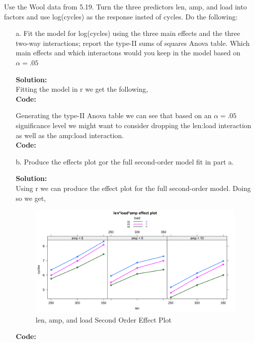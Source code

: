 \documentclass[12pt]{article}
\makeatletter
\theoremstyle{homework}
\newenvironment{exercise}[1]
{\def\@currentlabel{#1}\exercisecore}
{\endexercisecore}
\newcommand{\localhead}[1]{\par\smallskip\noindent\textbf{#1}\nobreak\\}%
\newcommand\solution{\localhead{Solution:}}
\makeatother
\begin{document}
\begin{exercise}{3} Use the Wool data from 5.19. Turn the three predictors len, amp, and load into factors and use 
  log(cycles) as the response insted of cycles. Do the following: \\
  \begin{enumerate}
    \item[a.] Fit the model for log(cycles) using the three main effects and the three two-way interactions; report 
    the type-II sums of squares Anova table. Which main effects and which interactons would you keep in the model based 
    on $\alpha = .05$\\
    \solution  Fitting the model in r we get the following, \\
    \textbf{Code:}
    \begin{center}
    
    \end{center}
    Generating the type-II Anova table we can see that based on an $\alpha  = .05$ significance level we might want to consider dropping
    the len:load interaction as well as the amp:load interaction. \\
    \textbf{Code:}
    \begin{center}
    
    \end{center}

    \newpage

    \item[b.] Produce the effects plot gor the full second-order model fit in part a. \\
    \solution Using r we can produce the effect plot for the full second-order model. Doing so we get, 
    \begin{figure}[H]
      \begin{center}
      \caption{len, amp, and load Second Order Effect Plot}
      \includegraphics[width =\textwidth]{Rplot02.png}
      \end{center}
     \end{figure}    
     \textbf{Code:}
     \begin{center}
     
     \end{center}
     \newpage


\end{enumerate}
\end{exercise}
\end{document}

